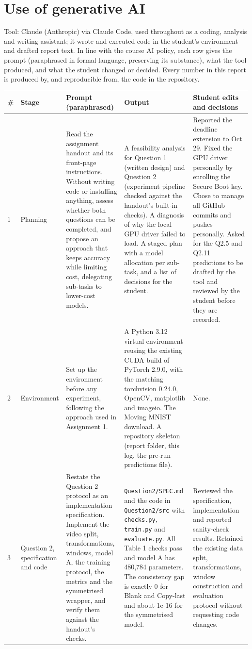 \section{Use of generative AI}

Tool: Claude (Anthropic) via Claude Code, used throughout as a coding, analysis and writing
assistant; it wrote and executed code in the student's environment and drafted report text.
In line with the course AI policy, each row gives the prompt (paraphrased in formal language,
preserving its substance), what the tool produced, and what the student changed or decided.
Every number in this report is produced by, and reproducible from, the code in the repository.

{\footnotesize
\begin{longtable}{p{}p{}p{}p{}p{}}
\toprule
\# & Stage & Prompt (paraphrased) & Output & Student edits and decisions \\ \midrule
\endhead
1 & Planning & Read the assignment handout and its front-page instructions. Without writing code or installing anything, assess whether both questions can be completed, and propose an approach that keeps accuracy while limiting cost, delegating sub-tasks to lower-cost models. & A feasibility analysis for Question 1 (written design) and Question 2 (experiment pipeline checked against the handout's built-in checks). A diagnosis of why the local GPU driver failed to load. A staged plan with a model allocation per sub-task, and a list of decisions for the student. & Reported the deadline extension to Oct 29. Fixed the GPU driver personally by enrolling the Secure Boot key. Chose to manage all GitHub commits and pushes personally. Asked for the Q2.5 and Q2.11 predictions to be drafted by the tool and reviewed by the student before they are recorded. \\ \midrule
2 & Environment & Set up the environment before any experiment, following the approach used in Assignment 1. & A Python 3.12 virtual environment reusing the existing CUDA build of PyTorch 2.9.0, with the matching torchvision 0.24.0, OpenCV, matplotlib and imageio. The Moving MNIST download. A repository skeleton (report folder, this log, the pre-run predictions file). & None. \\ \midrule
3 & Question 2, specification and code & Restate the Question 2 protocol as an implementation specification. Implement the video split, transformations, windows, model A, the training protocol, the metrics and the symmetrised wrapper, and verify them against the handout's checks. & \texttt{Question2/SPEC.md} and the code in \texttt{Question2/src} with \texttt{checks.py}, \texttt{train.py} and \texttt{evaluate.py}. All Table 1 checks pass and model A has 480,784 parameters. The consistency gap is exactly 0 for Blank and Copy-last and about 1e-16 for the symmetrised model. & Reviewed the specification, implementation and reported sanity-check results. Retained the existing data split, transformations, window construction and evaluation protocol without requesting code changes. \\ \midrule

\end{longtable}}
